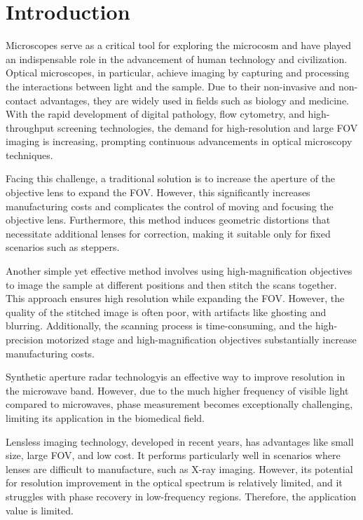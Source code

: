 \documentclass[journal,review,submit,pdftex,moreauthors]{Definitions/mdpi}
\begin{document}
\setcounter{section}{0} %

\section{Introduction}

Microscopes serve as a critical tool for exploring the microcosm and have played an indispensable role in the advancement of human technology and civilization. Optical microscopes, in particular, achieve imaging by capturing and processing the interactions between light and the sample. Due to their non-invasive and non-contact advantages, they are widely used in fields such as biology and medicine. With the rapid development of digital pathology, flow cytometry, and high-throughput screening technologies, the demand for high-resolution and large FOV imaging is increasing, prompting continuous advancements in optical microscopy techniques.

Facing this challenge, a traditional solution is to increase the aperture of the objective lens to expand the FOV. However, this significantly increases manufacturing costs and complicates the control of moving and focusing the objective lens. Furthermore, this method induces geometric distortions that necessitate additional lenses for correction, making it suitable only for fixed scenarios such as steppers.

Another simple yet effective method involves using high-magnification objectives to image the sample at different positions and then stitch the scans together. This approach ensures high resolution while expanding the FOV. However, the quality of the stitched image is often poor, with artifacts like ghosting and blurring. Additionally, the scanning process is time-consuming, and the high-precision motorized stage and high-magnification objectives substantially increase manufacturing costs.

Synthetic aperture radar technology\cite{turpin1995theory,holloway2017savi}is an effective way to improve resolution in the microwave band. However, due to the much higher frequency of visible light compared to microwaves, phase measurement becomes exceptionally challenging, limiting its application in the biomedical field.

Lensless imaging technology\cite{zhang2019lens}, developed in recent years, has advantages like small size, large FOV, and low cost. It performs particularly well in scenarios where lenses are difficult to manufacture, such as X-ray imaging\cite{thibault2008high}. However, its potential for resolution improvement in the optical spectrum is relatively limited, and it struggles with phase recovery in low-frequency regions\cite{zhang2019lens}. Therefore, the application value is limited.
\end{document}
